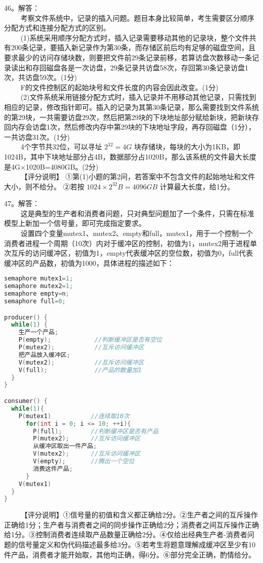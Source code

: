 46。解答： \\
$\qquad$ 考察文件系统中，记录的插入问题。题目本身比较简单，考生需要区分顺序分配方式和连接分配方式的区别。 \\
$\qquad$ (1)系统采用顺序分配方式时，插入记录需要移动其他的记录块，整个文件共有200条记录，要插入新记录作为第30条，而存储区前后均有足够的磁盘空间，且要求最少的访问存储块数，则要把文件前29条记录前移，若算访盘次数移动一条记录读出和存回磁盘各是一次访盘，29条记录共访盘58次，存回第30条记录访盘1次，共访盘59次。(1分) \\
$\qquad$ F的文件控制区的起始块号和文件长度的内容会因此改变。(1分) \\
$\qquad$ (2)文件系统采用链接分配方式时，插入记录并不用移动其他记录，只需找到相应的记录，修改指针即可。插入的记录为其第30条记录，那么需要找到文件系统的第29块，一共需要访盘29次，然后把第29块的下块地址部分赋给新块，把新块存回内存会访盘1次，然后修改内存中第29块的下块地址字段，再存回磁盘（1分），一共访盘31次。(1分) \\
$\qquad$ 4个字节共32位，可以寻址 $2^{32}=4G$ 块存储块，每块的大小为1KB，即1024B，其中下块地址部分占4B，数据部分占1020B，那么该系统的文件最大长度是4G×1020B=4080GB。(2分) \\
$\qquad$ 【评分说明】 ①第(1)小题的第2问，若答案中不包含文件的起始地址和文件大小，则不给分。 ②若按 $1024 \times 2^{32}B=4096GB$ 计算最大长度，给1分。

47。解答： \\
$\qquad$ 这是典型的生产者和消费者问题，只对典型问题加了一个条件，只需在标准模型上新加一个信号量，即可完成指定要求。 \\
$\qquad$ 设置四个变量mutex1、mutex2、empty和full，mutex1，用于一个控制一个消费者进程一个周期（10次）内对于缓冲区的控制，初值为1，mutex2用于进程单次互斥的访问缓冲区，初值为1，empty代表缓冲区的空位数，初值为0，full代表缓冲区的产品数，初值为1000，具体进程的描述如下：
\begin{lstlisting}[language=cpp]
semaphore mutex1=1;
semaphore mutex2=1;
semaphore empty=n;
semaphore full=0;

producer() {
  while(1) {
    生产一个产品;
    P(empty);            //判断缓冲区是否有空位
    P(mutex2);           //互斥访问缓冲区
    把产品放入缓冲区;
    V(mutex2);           //互斥访问缓冲区
    V(full);             //产品的数量加1
  }
}

consumer() {
  while(1){
    P(mutex1)           //连续取10次
      for(int i = 0; i <= 10; ++i){
        P(full);        //判断缓冲区是否有产品
        P(mutex2);      //互斥访问缓冲区
        从缓冲区取出一件产品;
        V(mutex2);      //互斥访问缓冲区
        V(empty);       //腾出一个空位
        消费这件产品;
      }
    V(mutex1)
  }
}
\end{lstlisting}
$\qquad$ 【评分说明】①信号量的初值和含义都正确给2分。②生产者之间的互斥操作正确给1分；生产者与消费者之间的同步操作正确给2分；消费者之间互斥操作正确给1分。③控制消费者连续取产品数量正确给2分。④仅给出经典生产者-消费者问题的信号量定义和伪代码描述最多给3分。⑤若考生将题意理解成缓冲区至少有10件产品，消费者才能开始取，其他均正确，得6分。⑥部分完全正确，酌情给分。
